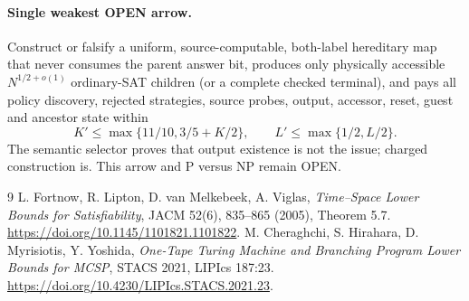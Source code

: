 \documentclass[11pt]{article}
\begin{document}
\paragraph{Single weakest OPEN arrow.}
Construct or falsify a uniform, source-computable, both-label hereditary map
that never consumes the parent answer bit, produces only physically accessible
$N^{1/2+o(1)}$ ordinary-SAT children (or a complete checked terminal), and pays
all policy discovery, rejected strategies, source probes, output, accessor,
reset, guest and ancestor state within
\[
 K'\le\max\{11/10,3/5+K/2\},\qquad
 L'\le\max\{1/2,L/2\}.
\]
The semantic selector proves that output existence is not the issue; charged
construction is.  This arrow and P versus NP remain OPEN.

\begin{thebibliography}{9}
 L. Fortnow, R. Lipton, D. van Melkebeek, A. Viglas,
\emph{Time--Space Lower Bounds for Satisfiability}, JACM 52(6), 835--865
(2005), Theorem 5.7.  \url{https://doi.org/10.1145/1101821.1101822}.
 M. Cheraghchi, S. Hirahara, D. Myrisiotis, Y. Yoshida,
\emph{One-Tape Turing Machine and Branching Program Lower Bounds for MCSP},
STACS 2021, LIPIcs 187:23.  \url{https://doi.org/10.4230/LIPIcs.STACS.2021.23}.
\end{thebibliography}
\end{document}
